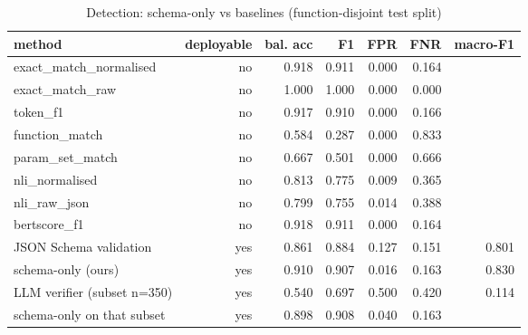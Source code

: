\begin{table}[t]
\centering
\caption{Detection: schema-only vs baselines (function-disjoint test split)}
\label{tab:baselines_detection_function_disjoint}
\begin{tabular}{lrrrrrr}
\hline
method & deployable & bal. acc & F1 & FPR & FNR & macro-F1 \\
\hline
exact\_match\_normalised & no & 0.918 & 0.911 & 0.000 & 0.164 &  \\
exact\_match\_raw & no & 1.000 & 1.000 & 0.000 & 0.000 &  \\
token\_f1 & no & 0.917 & 0.910 & 0.000 & 0.166 &  \\
function\_match & no & 0.584 & 0.287 & 0.000 & 0.833 &  \\
param\_set\_match & no & 0.667 & 0.501 & 0.000 & 0.666 &  \\
nli\_normalised & no & 0.813 & 0.775 & 0.009 & 0.365 &  \\
nli\_raw\_json & no & 0.799 & 0.755 & 0.014 & 0.388 &  \\
bertscore\_f1 & no & 0.918 & 0.911 & 0.000 & 0.164 &  \\
JSON Schema validation & yes & 0.861 & 0.884 & 0.127 & 0.151 & 0.801 \\
schema-only (ours) & yes & 0.910 & 0.907 & 0.016 & 0.163 & 0.830 \\
LLM verifier (subset n=350) & yes & 0.540 & 0.697 & 0.500 & 0.420 & 0.114 \\
schema-only on that subset & yes & 0.898 & 0.908 & 0.040 & 0.163 &  \\
\hline
\end{tabular}
\end{table}
